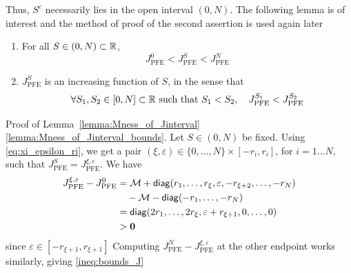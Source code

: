 \documentclass[aspectratio=169]{beamer}
\begin{document}
\begin{frame}
	Thus, $S^c$ necessarily lies in the open interval $(0,N)$.
	The following lemma is of interest and the method of proof of the second assertion is used again later
	\vfill
	\begin{lemma}\label{lemma:Mness_of_Jinterval}
	\begin{enumerate}
		\item \label{lemma:Mness_of_Jinterval_bounds}
		For all $S\in(0,N)\subset\mathbb{R}$,
		\begin{equation}\label{ineq:bounds_J}
		J_{\textrm{PFE}}^{0}< J_{\textrm{PFE}}^{S}<
		J_{\textrm{PFE}}^{N}
		\end{equation}
		\item \label{lemma:Mness_of_Jinterval_increase}
		$J_{\textrm{PFE}}^{S}$ is an increasing function of $S$, in the sense that
	\begin{equation}\label{eq:J_increasing}
	\forall S_1,S_2\in[0,N]\subset\mathbb{R}\textrm{ such that }S_1<S_2,
	\quad
	J_{\textrm{PFE}}^{S_1}< J_{\textrm{PFE}}^{S_2}
	\end{equation}
	\end{enumerate}
	\end{lemma}
\end{frame}


\begin{frame}{Proof of Lemma~\ref{lemma:Mness_of_Jinterval}}
\ref{lemma:Mness_of_Jinterval_bounds}.
	Let $S\in(0,N)$ be fixed.
	Using \eqref{eq:xi_epsilon_ri}, we get a pair $(\xi,\varepsilon)\in\{0,\ldots,N\}\times[-r_i,r_i]$, for $i=1\ldots N$, such that $J_{\textrm{PFE}}^{S}=J_{\textrm{PFE}}^{\xi,\varepsilon}$.
	We have
	\begin{align*}
	J_{\textrm{PFE}}^{\xi,\varepsilon}-J_{\textrm{PFE}}^{0} 
	&= \M+\diag(r_1,\ldots,r_{\xi},\varepsilon,-r_{\xi+2},\ldots,-r_N) \\
	&\quad -\M-\diag(-r_1,\ldots,-r_N) \\
	&= \diag(2r_1,\ldots,2r_{\xi},\varepsilon+r_{\xi+1},0,\ldots,0) \\
	&>\b0
	\end{align*}
	since $\varepsilon\in[-r_{\xi+1},r_{\xi+1}]$
	\vfill
	Computing $J_{\textrm{PFE}}^{N}-J_{\textrm{PFE}}^{\xi,\varepsilon}$ at the other endpoint works similarly, giving \eqref{ineq:bounds_J}
\end{frame}
\end{document}
